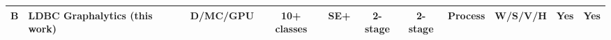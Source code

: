 \begin{tabular}[!tb]{|l|l|l|l|l|l|l|l|l|l|l|}
\hline
\hline
{\bf B} & {\bf LDBC Graphalytics} (this work) & \multicolumn{1}{c|}{{\bf D/MC/GPU}} & \multicolumn{1}{c|}{{\bf 10+ classes}} & \multicolumn{1}{c|}{{\bf SE+}} & \multicolumn{1}{c|}{{\bf 2-stage}} & \multicolumn{1}{c|}{{\bf 2-stage}} & \multicolumn{1}{c|}{{\bf Process}} & \multicolumn{1}{c|}{{\bf W/S/V/H}} & \multicolumn{1}{c|}{{\bf Yes}} & \multicolumn{1}{c|}{{\bf Yes}} \\ 
\hline
\end{tabular}

